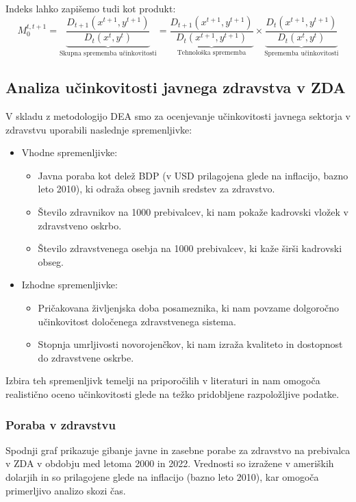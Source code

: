 \documentclass[12pt,a4paper]{article}
\theoremstyle{definition}
\begin{document}
Indeks lahko zapišemo tudi kot produkt:
\[
M_0^{t,t+1} = \underbrace{\frac{D_{t+1}(x^{t+1}, y^{t+1})}{D_t(x^t, y^t)}}_{\text{Skupna sprememba učinkovitosti}}
= \underbrace{\frac{D_{t+1}(x^{t+1}, y^{t+1})}{D_t(x^{t+1}, y^{t+1})}}_{\text{Tehnološka sprememba}}
\times
\underbrace{\frac{D_t(x^{t+1}, y^{t+1})}{D_t(x^t, y^t)}}_{\text{Sprememba učinkovitosti}}
\]

\subsection{Analiza učinkovitosti javnega zdravstva v ZDA}

V skladu z metodologijo DEA smo za ocenjevanje učinkovitosti javnega sektorja v zdravstvu uporabili naslednje spremenljivke:

\begin{itemize}
\item Vhodne spremenljivke:
    \begin{itemize}
        \item Javna poraba kot delež BDP (v USD prilagojena glede na inflacijo, bazno leto 2010), ki odraža obseg javnih sredstev za zdravstvo.
        \item Število zdravnikov na 1000 prebivalcev, ki nam pokaže kadrovski vložek v zdravstveno oskrbo.
        \item Število zdravstvenega osebja na 1000 prebivalcev, ki kaže širši kadrovski obseg.
    \end{itemize}
\item Izhodne spremenljivke:
    \begin{itemize}
        \item Pričakovana življenjska doba posameznika, ki nam povzame dolgoročno učinkovitost določenega zdravstvenega sistema.
        \item Stopnja umrljivosti novorojenčkov, ki nam izraža kvaliteto in dostopnost do zdravstvene oskrbe.
    \end{itemize}
\end{itemize}

Izbira teh spremenljivk temelji na priporočilih v literaturi \cite{Yaisawarng2002} in nam omogoča realistično oceno učinkovitosti glede na težko pridobljene razpoložljive podatke.

\subsubsection{Poraba v zdravstvu}

Spodnji graf prikazuje gibanje javne in zasebne porabe za zdravstvo na prebivalca v ZDA v obdobju med letoma 2000 in 2022. 
Vrednosti so izražene v ameriških dolarjih in so prilagojene glede na inflacijo (bazno leto 2010), kar omogoča primerljivo analizo skozi čas.
\end{document}
